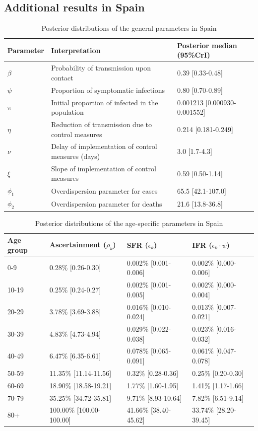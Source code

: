 \documentclass{article}
\begin{document}
\subsection{Additional results in Spain}
\begin{table}[H]
	\centering
	\begin{tabular}{lll}
		\hline
		Parameter & Interpretation & Posterior median (95\%CrI) \\ 
		\hline
		$\beta$ & Probability of transmission upon contact & 0.39 [0.33-0.48] \\ 
		$\psi$ & Proportion of symptomatic infections & 0.80 [0.70-0.89] \\ 
		$\pi$ & Initial proportion of infected in the population & 0.001213 [0.000930-0.001552] \\ 
		$\eta$ & Reduction of transmission due to control measures & 0.214 [0.181-0.249] \\ 
		$\nu$ & Delay of implementation of control measures (days) & 3.0 [1.7-4.3] \\ 
		$\xi$ & Slope of implementation of control measures & 0.59 [0.50-1.14] \\ 
		$\phi_1$ & Overdispersion parameter for cases & 65.5 [42.1-107.0] \\ 
		$\phi_2$ & Overdispersion parameter for deaths & 21.6 [13.8-36.8] \\ 
		\hline
	\end{tabular}
	\caption{Posterior distributions of the general parameters in Spain} 
\end{table}
\begin{table}[H]
	\centering
	\begin{tabular}{llll}
		\hline
		Age group & Ascertainment ($\rho_k$) & SFR ($\epsilon_k$) & IFR ($\epsilon_k\cdot\psi$) \\ 
		\hline
		0-9 & 0.28\% [0.26-0.30] & 0.002\% [0.001-0.006] & 0.002\% [0.000-0.006] \\ 
		10-19 & 0.25\% [0.24-0.27] & 0.002\% [0.001-0.005] & 0.002\% [0.000-0.004] \\ 
		20-29 & 3.78\% [3.69-3.88] & 0.016\% [0.010-0.024] & 0.013\% [0.007-0.021] \\ 
		30-39 & 4.83\% [4.73-4.94] & 0.029\% [0.022-0.038] & 0.023\% [0.016-0.032] \\ 
		40-49 & 6.47\% [6.35-6.61] & 0.078\% [0.065-0.091] & 0.061\% [0.047-0.078] \\ 
		50-59 & 11.35\% [11.14-11.56] & 0.32\% [0.28-0.36] & 0.25\% [0.20-0.30] \\ 
		60-69 & 18.90\% [18.58-19.21] & 1.77\% [1.60-1.95] & 1.41\% [1.17-1.66] \\ 
		70-79 & 35.25\% [34.72-35.81] & 9.71\% [8.93-10.64] & 7.82\% [6.51-9.14] \\ 
		80+ & 100.00\% [100.00-100.00] & 41.66\% [38.40-45.62] & 33.74\% [28.20-39.45] \\ 
		\hline
	\end{tabular}
	\caption{Posterior distributions of the age-specific parameters in Spain} 
\end{table}
\clearpage
\end{document}
